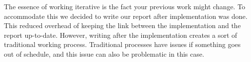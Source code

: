 The essence of working iterative is the fact your previous work might change.
To accommodate this we decided to write our report after implementation was done. This reduced overhead of keeping the link between the implementation and the report up-to-date.
However, writing after the implementation creates a sort of traditional working process.
Traditional processes have issues if something goes out of schedule, and this issue can also be problematic in this case.

